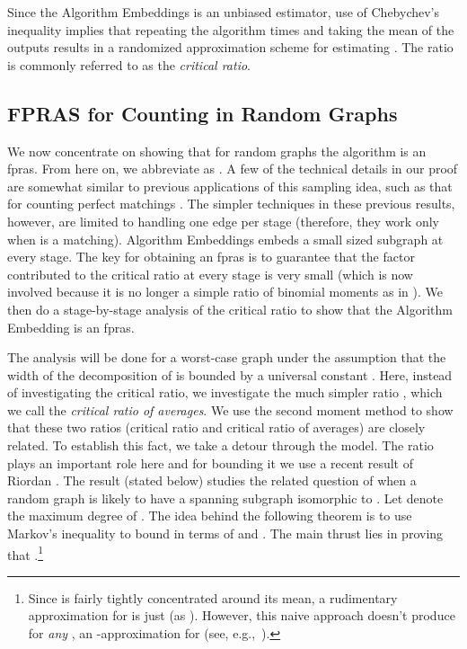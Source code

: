 \documentclass[11pt]{article}
\begin{document}
Since the Algorithm Embeddings is an unbiased estimator, use of Chebychev's inequality implies that repeating the algorithm  times and taking the mean of the outputs results in a randomized approximation scheme for estimating .  The ratio  is commonly referred to as the {\em critical ratio}.  


\subsection{FPRAS for Counting in Random Graphs}
We now concentrate on showing that for random graphs the algorithm is an fpras. From here on, we abbreviate  as . A few of the technical details in our proof are somewhat similar to previous applications of this sampling idea, such as that for counting perfect matchings \cite{ras,shiva1}. The simpler techniques in these previous results, however, are limited to handling one edge per stage (therefore, they work only when  is a matching).  Algorithm Embeddings embeds a small sized subgraph at every stage. The key for obtaining an fpras is to guarantee that the factor contributed to the critical ratio at every stage is very small (which is now involved because it is no longer a simple ratio of binomial moments as in \cite{ras,shiva1}). We then do a stage-by-stage analysis of the critical ratio 
to show that the Algorithm Embedding is an fpras.

The analysis will be done for a worst-case graph  under the assumption that the width of the decomposition of  is bounded by a universal constant . Here, instead of investigating the critical ratio, we investigate the much simpler ratio , which we call the {\em critical ratio of averages}. We use the second moment method to show that these two ratios (critical ratio and critical ratio of averages) are closely related. To establish this fact, we take a detour through the  model. The ratio  plays an important role here and for bounding it we use a recent result of Riordan \cite{riordan}. The result (stated below) studies the related question of when a random graph  is likely to have a spanning subgraph isomorphic to .  Let  denote the maximum degree of . The idea behind the following theorem is to use Markov's inequality to bound  in terms of  and . The main thrust lies in proving that .\!\footnote{
Since  is fairly tightly concentrated around its mean, a rudimentary approximation for  is just  (as ). However, this naive approach doesn't produce for {\em any} , an -approximation for  (see, e.g.,~\cite{frieze,suen,ras,ras1,chien}).}
\end{document}
